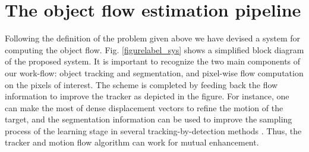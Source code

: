 \section{The object flow estimation pipeline}
\label{sec:desc}

Following the definition of the problem given above we have devised a system for computing the object flow.
Fig. \ref{figurelabel_sys} shows a simplified block diagram of the proposed system. It is important to recognize the two main 
components of our work-flow: object tracking and segmentation, and pixel-wise flow computation on the pixels of interest.  The scheme is completed by feeding back the flow 
information to improve the tracker as depicted in the figure. For instance, one can make the most of dense displacement vectors to refine the motion of the target, and 
the segmentation information can be used to improve the sampling process of the learning stage in several tracking-by-detection methods \cite{c16}. Thus, 
the tracker and motion flow algorithm can work for mutual enhancement.



